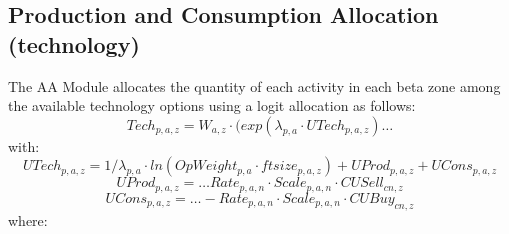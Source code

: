 \subsection{Production and Consumption Allocation (technology)}\label{sec:aa-pca-technology}
The AA Module allocates the quantity of each activity in each beta zone among the available technology options using a logit allocation as follows:
\begin{equation}\label{eq:6.03}
Tech_{p,a,z} = W_{a,z} \cdot (exp(\lambda_{p,a} \cdot UTech_{p,a,z}) \ldots
\end{equation}
\noindent with:
\begin{equation}\label{eq:6.04}
UTech_{p,a,z} = 1/\lambda_{p,a} \cdot ln(OpWeight_{p,a} \cdot ftsize_{p,a,z}) + UProd_{p,a,z} + UCons_{p,a,z}
\end{equation}
\begin{equation}\label{eq:6.05}
UProd_{p,a,z} = \ldots Rate_{p,a,n} \cdot Scale_{p,a,n} \cdot CUSell_{cn,z}
\end{equation}
\begin{equation}\label{eq:6.06}
UCons_{p,a,z} = \ldots -Rate_{p,a,n} \cdot Scale_{p,a,n} \cdot CUBuy_{cn,z}
\end{equation}
\noindent where:
